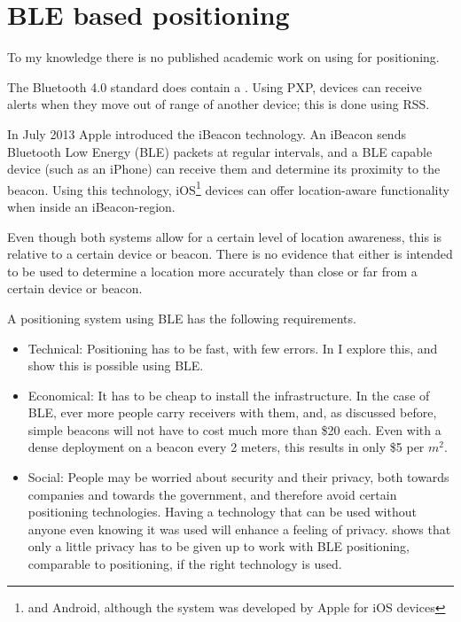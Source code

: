 \section{BLE based positioning}
To my knowledge there is no published academic work on using \BLE for positioning.

The Bluetooth 4.0 standard does contain a .
Using PXP, devices can receive alerts when they move out of range of another device; this is done using RSS.

In July 2013 Apple introduced the iBeacon technology.
An iBeacon sends Bluetooth Low Energy (BLE) packets at regular intervals, and a BLE capable device (such as an iPhone) can receive them and determine its proximity to the beacon.
Using this technology, iOS\footnote{and Android, although the system was developed by Apple for iOS devices} devices can offer location-aware functionality when inside an iBeacon-region.

Even though both systems allow for a certain level of location awareness, this is relative to a certain device or beacon.
There is no evidence that either is intended to be used to determine a location more accurately than close or far from a certain device or beacon.

A positioning system using BLE has the following requirements.
\begin{itemize}
    \item Technical: Positioning has to be fast, with few errors. In  I explore this, and show this is possible using BLE.
    \item Economical: It has to be cheap to install the infrastructure. In the case of BLE, ever more people carry receivers with them, and, as discussed before, simple beacons will not have to cost much more than \$20 each.
        Even with a dense deployment on a beacon every 2 meters, this results in only \$5 per $m^2$.
    \item Social: People may be worried about security and their privacy, both towards companies and towards the government, and therefore avoid certain positioning technologies.
        Having a technology that can be used without anyone even knowing it was used will enhance a feeling of privacy.
         shows that only a little privacy has to be given up to work with BLE positioning, comparable to \wifi positioning, if the right technology is used.
\end{itemize}

